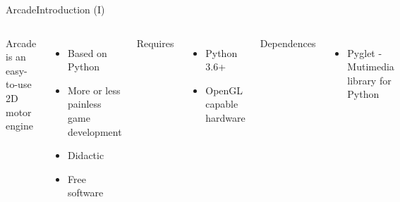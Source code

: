 \documentclass[10pt,compress]{beamer} %
\begin{document}
\begin{frame}{Arcade}{Introduction (I)}
	\begin{columns}
            Arcade is an easy-to-use 2D motor engine
            \begin{itemize}
                \item Based on Python
                \item More or less painless game development
                \item Didactic
                \item Free software
            \end{itemize}

        	Requires
            \begin{itemize}
                \item Python 3.6+
                \item OpenGL capable hardware
            \end{itemize}

            Dependences
            \begin{itemize}
                \item Pyglet - Mutimedia library for Python
            \end{itemize}

            \includegraphics[width=\linewidth]{figs/arcade-logo}
	\end{columns}
\end{frame}
\end{document}
